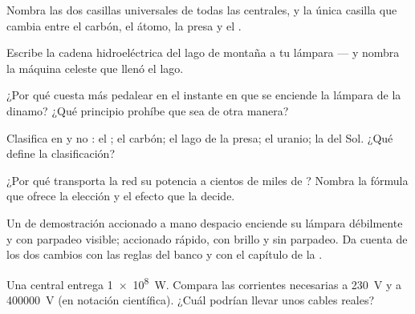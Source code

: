 \begin{exercise}[$\star$]\label{exo:g9:alternator:4}
Nombra las dos casillas universales de todas las centrales, y la única
casilla que cambia entre el carbón, el átomo, la presa y el
.
\end{exercise}

\begin{exercise}[$\star$]\label{exo:g9:alternator:5}
Escribe la cadena hidroeléctrica del lago de montaña a tu lámpara --- y
nombra la máquina celeste que llenó el lago.
\end{exercise}

\begin{exercise}[$\star$]\label{exo:g9:alternator:6}
¿Por qué cuesta más pedalear en el instante en que se enciende la
lámpara de la dinamo? ¿Qué principio prohíbe que sea de otra manera?
\end{exercise}

\begin{exercise}[$\star$]\label{exo:g9:alternator:7}
Clasifica en  y no : el ; el
carbón; el lago de la presa; el uranio; la  del Sol. ¿Qué define la
clasificación?
\end{exercise}

\begin{exercise}[$\star$]\label{exo:g9:alternator:8}
¿Por qué transporta la red su potencia a cientos de miles de
? Nombra la fórmula que ofrece la elección y el efecto que
la decide.
\end{exercise}

\begin{exercise}[$\star\star$]\label{exo:g9:alternator:9}
Un  de demostración accionado a mano despacio
enciende su lámpara débilmente y con parpadeo visible; accionado
rápido, con brillo y sin parpadeo. Da cuenta de los dos cambios con las
reglas del banco y con el capítulo de la .
\end{exercise}

\begin{exercise}[$\star\star$]\label{exo:g9:alternator:10}
Una central entrega \qty{1e8}{W}. Compara las corrientes necesarias a
\qty{230}{V} y a \qty{400000}{V} (en notación científica). ¿Cuál
podrían llevar unos cables reales?
\end{exercise}

